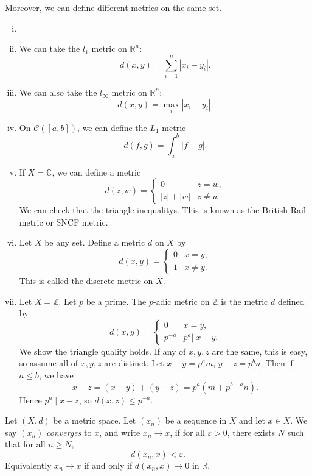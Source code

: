\documentclass[12pt]{article}
\begin{document}
Moreover, we can define different metrics on the same set.

\begin{exbox}
	\begin{enumerate}[(i)]
		\item[]
		\item We can take the $l_1$ metric on $\mathbb{R}^{n}$:
			\[
				d(x, y) = \sum_{i = 1}^{n}|x_i - y_i|
			.\]
		\item We can also take the $l_{\infty}$ metric on $\mathbb{R}^{n}$:
			\[
				d(x, y) = \max_{i} |x_i - y_i|
			.\]
		\item On $\mathcal{C}([a, b])$, we can define the $L_1$ metric
			\[
				d(f, g) = \int_{a}^{b}|f - g|
			.\]
		\item If $X = \mathbb{C}$, we can define a metric
			\[
				d(z, w) =
				\begin{cases}
					0 & z = w,\\
					|z| + |w| & z \neq w.
				\end{cases}
			\]
			We can check that the triangle inequalitys. This is known as the British Rail metric or SNCF metric.
		\item Let $X$ be any set. Define a metric $d$ on $X$ by
			\[
				d(x, y) =
				\begin{cases}
					0 & x = y,\\
					1 & x \neq y.
				\end{cases}
			\]
			This is called the discrete metric on $X$.
		\item Let $X = \mathbb{Z}$. Let $p$ be a prime. The $p$-adic metric on $\mathbb{Z}$ is the metric $d$ defined by
			\[
				d(x, y) =
				\begin{cases}
					0 & x = y, \\
					p^{-a} & p^{a} |\!| x - y.
				\end{cases}
			\]
			We show the triangle quality holds. If any of $x, y, z$ are the same, this is easy, so assume all of $x, y, z$ are distinct. Let $x - y= p^{a}m$, $y - z = p^{b}n$. Then if $a \leq b$, we have
			\[
				x - z = (x - y) + (y - z) = p^{a}(m + p^{b-a}n)
			.\]
			Hence $p^{a} \mid x - z$, so $d(x, z) \leq p^{-a}$.
\end{enumerate}
\end{exbox}

\begin{definition}
	Let $(X, d)$ be a metric space. Let $(x_n)$ be a sequence in $X$ and let $x \in X$. We say $(x_n)$ \textit{converges} to $x$, and write $x_n \to x$, if for all $\varepsilon > 0$, there exists $N$ such that for all $n \geq N$,
	\[
		d(x_n, x) < \varepsilon
	.\]
	Equivalently $x_n \to x$ if and only if $d(x_n, x) \to 0$ in $\mathbb{R}$.
\end{definition}
\end{document}
